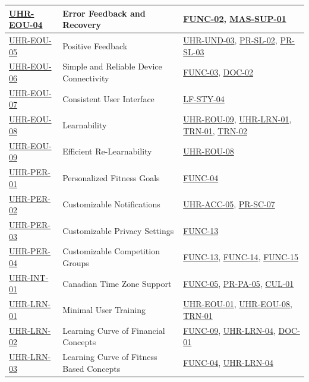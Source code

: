 \documentclass[12pt]{article}
\begin{document}
\begin{xltabular}{\textwidth}{|p{2.3cm}|p{4.2cm}|X|}
\hline
\hyperlink{req:UHR-EOU-04}{UHR-EOU-04} & Error Feedback and Recovery & \hyperlink{req:FUNC-02}{FUNC-02}, \hyperlink{req:MAS-SUP-01}{MAS-SUP-01} \\
\hline
\hyperlink{req:UHR-EOU-05}{UHR-EOU-05} & Positive Feedback & \hyperlink{req:UHR-UND-03}{UHR-UND-03}, \hyperlink{req:PR-SL-02}{PR-SL-02}, \hyperlink{req:PR-SL-03}{PR-SL-03} \\
\hline
\hyperlink{req:UHR-EOU-06}{UHR-EOU-06} & Simple and Reliable Device Connectivity & \hyperlink{req:FUNC-03}{FUNC-03}, \hyperlink{req:DOC-02}{DOC-02} \\
\hline
\hyperlink{req:UHR-EOU-07}{UHR-EOU-07} & Consistent User Interface & \hyperlink{req:LF-STY-04}{LF-STY-04} \\
\hline
\hyperlink{req:UHR-EOU-08}{UHR-EOU-08} & Learnability & \hyperlink{req:UHR-EOU-09}{UHR-EOU-09}, \hyperlink{req:UHR-LRN-01}{UHR-LRN-01}, \hyperlink{req:TRN-01}{TRN-01}, \hyperlink{req:TRN-02}{TRN-02} \\
\hline
\hyperlink{req:UHR-EOU-09}{UHR-EOU-09} & Efficient Re-Learnability & \hyperlink{req:UHR-EOU-08}{UHR-EOU-08} \\
\hline
\hyperlink{req:UHR-PER-01}{UHR-PER-01} & Personalized Fitness Goals & \hyperlink{req:FUNC-04}{FUNC-04} \\
\hline
\hyperlink{req:UHR-PER-02}{UHR-PER-02} & Customizable Notifications & \hyperlink{req:UHR-ACC-05}{UHR-ACC-05}, \hyperlink{req:PR-SC-07}{PR-SC-07} \\
\hline
\hyperlink{req:UHR-PER-03}{UHR-PER-03} & Customizable Privacy Settings & \hyperlink{req:FUNC-13}{FUNC-13} \\
\hline
\hyperlink{req:UHR-PER-04}{UHR-PER-04} & Customizable Competition Groups & \hyperlink{req:FUNC-13}{FUNC-13}, \hyperlink{req:FUNC-14}{FUNC-14}, \hyperlink{req:FUNC-15}{FUNC-15} \\
\hline
\hyperlink{req:UHR-INT-01}{UHR-INT-01} & Canadian Time Zone Support & \hyperlink{req:FUNC-05}{FUNC-05}, \hyperlink{req:PR-PA-05}{PR-PA-05}, \hyperlink{req:CUL-01}{CUL-01} \\
\hline
\hyperlink{req:UHR-LRN-01}{UHR-LRN-01} & Minimal User Training & \hyperlink{req:UHR-EOU-01}{UHR-EOU-01}, \hyperlink{req:UHR-EOU-08}{UHR-EOU-08}, \hyperlink{req:TRN-01}{TRN-01} \\
\hline
\hyperlink{req:UHR-LRN-02}{UHR-LRN-02} & Learning Curve of Financial Concepts & \hyperlink{req:FUNC-09}{FUNC-09}, \hyperlink{req:UHR-LRN-04}{UHR-LRN-04}, \hyperlink{req:DOC-01}{DOC-01} \\
\hline
\hyperlink{req:UHR-LRN-03}{UHR-LRN-03} & Learning Curve of Fitness Based Concepts & \hyperlink{req:FUNC-04}{FUNC-04}, \hyperlink{req:UHR-LRN-04}{UHR-LRN-04} \\

\end{xltabular}
\end{document}
